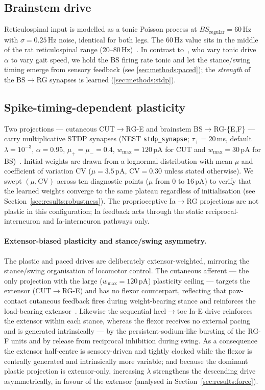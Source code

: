 \subsection{Brainstem drive}\label{sec:methods:bs}
Reticulospinal input is modelled as a tonic Poisson process at
$BS_{\text{regular}}=60$\,Hz with $\sigma=0.25$\,Hz noise, identical for
both legs. The 60\,Hz value sits in the
middle of the rat reticulospinal range
(20--80\,Hz)~\cite{drew1986,brocard2010}. In contrast to~\cite{zhang2022},
who vary tonic drive $\alpha$ to vary gait speed, we hold the BS firing
rate tonic and let the stance/swing timing emerge from sensory feedback
(see \autoref{sec:methods:paced}); the \emph{strength} of the BS$\to$RG
synapses is learned (\autoref{sec:methods:stdp}).

\subsection{Spike-timing-dependent plasticity}\label{sec:methods:stdp}
Two projections --- cutaneous CUT$\to$RG-E and brainstem
BS$\to$RG-\{E,F\} --- carry multiplicative STDP synapses (NEST
\verb|stdp_synapse|; $\tau_+=20$\,ms, default $\lambda=10^{-3}$,
$\alpha=0.95$, $\mu_+=\mu_-=0.4$, $w_{\max}=120$\,pA for CUT and
$w_{\max}=30$\,pA for BS)~\cite{biPoo1998,morrison2007}. Initial
weights are drawn from a lognormal distribution with mean $\mu$ and
coefficient of variation CV ($\mu=3.5$\,pA, CV$=0.30$ unless stated
otherwise). We swept $(\mu,\text{CV})$ across ten diagnostic points
($\mu$ from $0$ to $16$\,pA) to verify that the learned weights converge
to the same plateau regardless of initialisation (see
Section~\ref{sec:results:robustness}). The proprioceptive
Ia$\to$RG projections are not plastic in this configuration; Ia
feedback acts through the static reciprocal-interneuron and
Ia-interneuron pathways only.

\paragraph{Extensor-biased plasticity and stance/swing asymmetry.}
The plastic and paced drives are deliberately extensor-weighted, mirroring
the stance/swing organisation of locomotor control. The cutaneous
afferent --- the only projection with the large ($w_{\max}=120$\,pA)
plasticity ceiling --- targets the extensor (CUT$\to$RG-E) and has no
flexor counterpart, reflecting that paw-contact cutaneous feedback fires
during weight-bearing stance and reinforces the load-bearing
extensor~\cite{pearson1995,rossignol2006}. Likewise the sequential
heel$\to$toe Ia-E drive reinforces the extensor within each stance, whereas the
flexor receives no external pacing and is generated intrinsically ---
by the persistent-sodium-like bursting of the RG-F units and by release
from reciprocal inhibition during swing. As a consequence the extensor
half-centre is sensory-driven and tightly clocked while the flexor is
centrally generated and intrinsically more variable; and because the
dominant plastic projection is extensor-only, increasing $\lambda$
strengthens the descending drive asymmetrically, in favour of the
extensor (analysed in Section~\ref{sec:results:force}).

